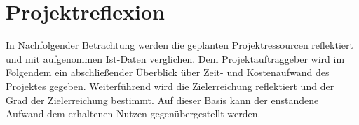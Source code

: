 \section{Projektreflexion}
\label{sec:Projektreflexion}

In Nachfolgender Betrachtung werden die geplanten Projektressourcen reflektiert und mit aufgenommen Ist-Daten verglichen.
Dem Projektauftraggeber wird im Folgendem ein abschließender Überblick über Zeit- und Kostenaufwand des Projektes gegeben.
Weiterführend wird die Zielerreichung reflektiert und der Grad der Zielerreichung bestimmt. Auf dieser Basis kann der
enstandene Aufwand dem erhaltenen Nutzen gegenübergestellt werden.




